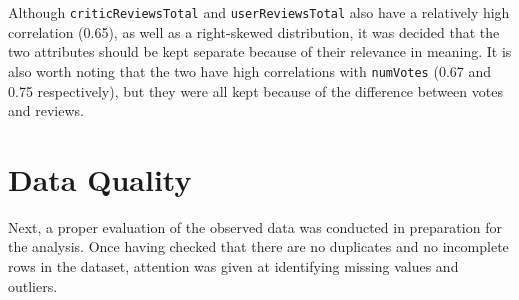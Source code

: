 Although \texttt{criticReviewsTotal} and \texttt{userReviewsTotal} also have a relatively high correlation (0.65), as well as a right-skewed distribution, it was decided that the two attributes should be kept separate because of their relevance in meaning. It is also worth noting that the two have high correlations with \texttt{numVotes} (0.67 and 0.75 respectively), but they were all kept because of the difference between votes and reviews.



\section{Data Quality}\label{sec:data_quality}
Next, a proper evaluation of the observed data was conducted in preparation for the analysis.
Once having checked that there are no duplicates and no incomplete rows in the dataset,
attention was given at identifying missing values and outliers.



